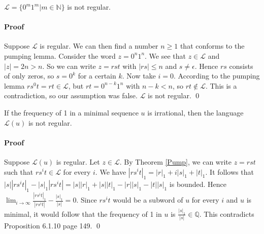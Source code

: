 \documentclass{article}
\begin{document}
\begin{automata}
$\mathcal{L} = \{0^m1^m | m \in \mathbb{N}\}$ is not regular.
\end{automata}

\paragraph{Proof}
Suppose $\mathcal{L}$ is regular. We can then find a number $n \ge 1$ that
conforms to the pumping lemma. Consider the word $z = 0^n 1^n$. We see that 
$z \in \mathcal{L}$ and $|z| = 2n > n$. So we can write $z = r s t$ with 
$|r s| \le n$ and $s \ne \epsilon$. Hence $rs$ consists of only zeros, so 
$s = 0^k$ for a certain $k$. Now take $i = 0$. According to the pumping lemma
$r s^0 t = r t \in \mathcal{L}$, but $r t = 0^{n - k} 1^n$ with $n - k < n$, so
$rt \notin \mathcal{L}$. This is a contradiction, so our assumption was false.
$\mathcal{L}$ is not regular. \qed

\begin{automata}
If the frequency of 1 in a minimal sequence $u$ is irrational, then the 
language $\mathcal{L}(u)$ is not regular.
\end{automata}

\paragraph{Proof}
Suppose $\mathcal{L}(u)$ is regular. Let $z \in \mathcal{L}$. By Theorem 
\ref{Pump}, we can write $z = r s t$ such that $r s^i t \in \mathcal{L}$ for
every $i$. We have $|r s^i t|_1 = |r|_1 + i|s|_1 + |t|_1$. It follows that
$|s| |r s^i t|_1 - |s|_1 |r s^i t| = |s| |r|_1 + |s| |t|_1 - |r| |s|_1 - 
|t| |s|_1$ is bounded. Hence $\lim_{i \to \infty} 
\frac{|r s^i t|_1}{|r s^i t|} - \frac{|s|_1}{|s|} = 0$. Since $r s^i t$ would
be a subword of $u$ for every $i$ and $u$ is minimal, it would follow that the
frequency of 1 in $u$ is $\frac{|s|_1}{|s|} \in \mathbb{Q}$. This contradicts
Proposition 6.1.10 \cite{Fogg} page 149. \qed
\end{document}
